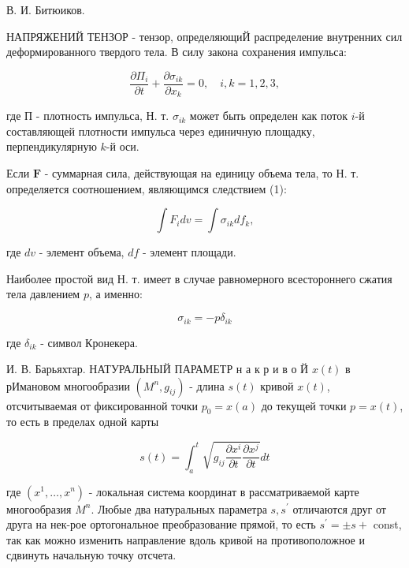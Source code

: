 \documentclass[10pt]{article}
\begin{document}
В. И. Битюиков.



НАПРЯЖЕНИЙ ТЕНЗОР - тензор, определяющиЙ распределение внутренних сил деформированного твердого тела. В силу закона сохранения импульса:



\[

\frac{\partial \Pi_{i}}{\partial t}+\frac{\partial \sigma_{i k}}{\partial x_{k}}=0, \quad i, k=1,2,3,

\]



где П - плотность импульса, Н. т. $\sigma_{i k}$ может быть определен как поток $i$-й составляющей плотности импульса через единичную площадку, перпендикулярную $k$-й оси.



Если $\boldsymbol{F}$ - суммарная сила, действующая на единицу объема тела, то Н. т. определяется соотношением, являющимся следствием (1):



\[

\int F_{i} d v=\int \sigma_{i k} d f_{k},

\]



где $d v$ - элемент объема, $d f$ - элемент площади.



Наиболее простой вид Н. т. имеет в случае равномерного всестороннего сжатия тела давлением $p$, а именно:



\[

\sigma_{i k}=-p \delta_{i k}

\]



где $\delta_{i k}$ - символ Кронекера.



И. В. Барьяхтар. НАТУРАЛЬНЫЙ ПАРАМЕТР н а к р и в о Й $x(t)$ в рИмановом многообразии $\left(M^{n}, g_{i j}\right)$ - длина $s(t)$ кривой $x(t)$, отсчитываемая от фиксированной точки $p_{0}=x(a)$ до текущей точки $p=x(t)$, то есть в пределах одной карты



\[

s(t)=\int_{a}^{t} \sqrt{g_{i j} \frac{\partial x^{i}}{\partial t} \frac{\partial x^{j}}{\partial t}} d t

\]



где $\left(x^{1}, \ldots, x^{n}\right)$ - локальная система координат в рассматриваемой карте многообразия $M^{n}$. Любые два натуральных параметра $s, s^{\prime}$ отличаются друг от друга на нек-рое ортогональное преобразование прямой, то есть $s^{\prime}= \pm s+$ const, так как можно изменить направление вдоль кривой на противоположное и сдвинуть начальную точку отсчета.
\end{document}
